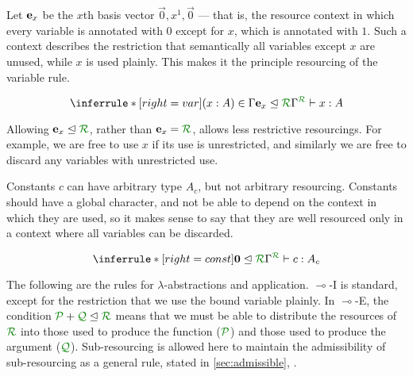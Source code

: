Let $\mathbf{e}_{x}$ be the $x$th basis vector $\vec 0, x^1, \vec 0$ --- that is, the
resource context in which every variable is annotated with $0$ except for $x$,
which is annotated with $1$.
Such a context describes the restriction that semantically all variables except
$x$ are unused, while $x$ is used plainly.
This makes it the principle resourcing of the variable rule.

\[
  \inferrule*[right=var]
  {(x : A) \in \Gamma
    \\ \subrctx{\basis x}{\resctx R}
  }
  {\ctx{\Gamma}{R} \vdash x : A}
\]

Allowing $\basis x \subres \resctx R$, rather than $\basis x = \resctx R$,
allows less restrictive resourcings.
For example, we are free to use $x$ if its use is unrestricted, and similarly we
are free to discard any variables with unrestricted use. 

Constants $c$ can have arbitrary type $A_c$, but not arbitrary resourcing.
Constants should have a global character, and not be able to depend on the
context in which they are used, so it makes sense to say that they are well
resourced only in a context where all variables can be discarded. 

\[
  \inferrule*[right=const]
  {\subrctx{\vct 0}{\resctx R}}
  {\ctx{\Gamma}{R} \vdash c : A_c}
\]

The following are the rules for $\lambda$-abstractions and application.
$\multimap$-I is standard, except for the restriction that we use the bound
variable plainly.
In $\multimap$-E, the condition $\resctx P + \resctx Q \subres \resctx R$
means that we must be able to distribute the resources of $\resctx R$ into
those used to produce the function ($\resctx P$) and those used to produce the
argument ($\resctx Q$).
Sub-resourcing is allowed here to maintain the admissibility of sub-resourcing
as a general rule, stated in \autoref{sec:admissible}, .


